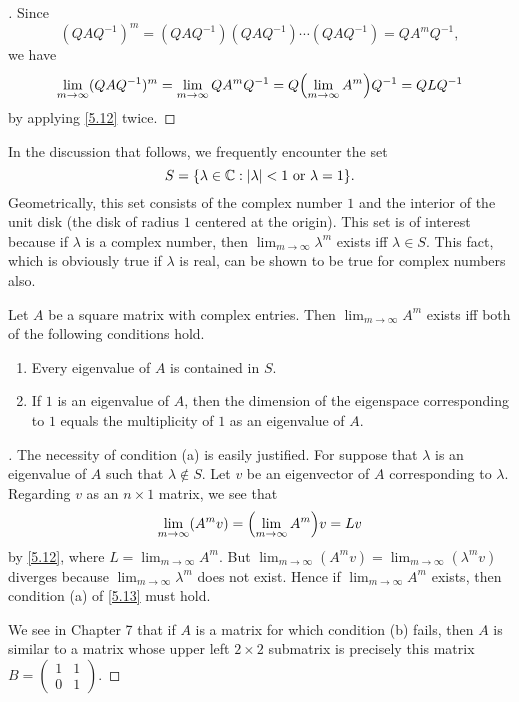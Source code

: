 \begin{proof}[]
  Since
  \[
    (Q A Q^{-1})^m = (Q A Q^{-1}) (Q A Q^{-1}) \cdots (Q A Q^{-1}) = Q A^m Q^{-1},
  \]
  we have
  \[
    \lim_{m \to \infty} (Q A Q^{-1})^m = \lim_{m \to \infty} Q A^m Q^{-1} = Q \pa{\lim_{m \to \infty} A^m} Q^{-1} = Q L Q^{-1}
  \]
  by applying \cref{5.12} twice.
\end{proof}

\begin{defn}\label{5.3.3}
  In the discussion that follows, we frequently encounter the set
  \[
    S = \set{\lambda \in \C : \abs{\lambda} < 1 \text{ or } \lambda = 1}.
  \]
  Geometrically, this set consists of the complex number \(1\) and the interior of the unit disk (the disk of radius \(1\) centered at the origin).
  This set is of interest because if \(\lambda\) is a complex number, then \(\lim_{m \to \infty} \lambda^m\) exists iff \(\lambda \in S\).
  This fact, which is obviously true if \(\lambda\) is real, can be shown to be true for complex numbers also.
\end{defn}

\begin{thm}\label{5.13}
  Let \(A\) be a square matrix with complex entries.
  Then \(\lim_{m \to \infty} A^m\) exists iff both of the following conditions hold.
  \begin{enumerate}
    \item Every eigenvalue of \(A\) is contained in \(S\).
    \item If \(1\) is an eigenvalue of \(A\), then the dimension of the eigenspace corresponding to \(1\) equals the multiplicity of \(1\) as an eigenvalue of \(A\).
  \end{enumerate}
\end{thm}

\begin{proof}[]
  The necessity of condition (a) is easily justified.
  For suppose that \(\lambda\) is an eigenvalue of \(A\) such that \(\lambda \notin S\).
  Let \(v\) be an eigenvector of \(A\) corresponding to \(\lambda\).
  Regarding \(v\) as an \(n \times 1\) matrix, we see that
  \[
    \lim_{m \to \infty} (A^m v) = \pa{\lim_{m \to \infty} A^m} v = Lv
  \]
  by \cref{5.12}, where \(L = \lim_{m \to \infty} A^m\).
  But \(\lim_{m \to \infty} (A^m v) = \lim_{m \to \infty} (\lambda^m v)\) diverges because \(\lim_{m \to \infty} \lambda^m\) does not exist.
  Hence if \(\lim_{m \to \infty} A^m\) exists, then condition (a) of \cref{5.13} must hold.

  We see in Chapter 7 that if \(A\) is a matrix for which condition (b) fails, then \(A\) is similar to a matrix whose upper left \(2 \times 2\) submatrix is precisely this matrix \(B = \begin{pmatrix}
    1 & 1 \\
    0 & 1
  \end{pmatrix}\).
\end{proof}

